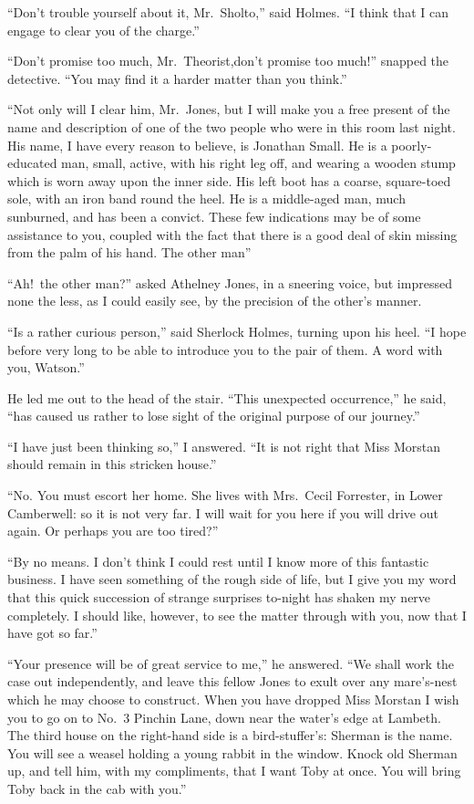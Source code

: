 \documentclass[12pt,english,oneside]{book}
\begin{document}
{}``Don't trouble yourself about it, Mr.\ Sholto,'' said Holmes.
{}``I think that I can engage to clear you of the charge.''

{}``Don't promise too much, Mr.\ Theorist,\mdsh{---}don't promise
too much!'' snapped the detective. {}``You may find it a harder
matter than you think.''

{}``Not only will I clear him, Mr.\ Jones, but I will make you a
free present of the name and description of one of the two people
who were in this room last night. His name, I have every reason to
believe, is Jonathan Small. He is a poorly-educated man, small, active,
with his right leg off, and wearing a wooden stump which is worn away
upon the inner side. His left boot has a coarse, square-toed sole,
with an iron band round the heel. He is a middle-aged man, much sunburned,
and has been a convict. These few indications may be of some assistance
to you, coupled with the fact that there is a good deal of skin missing
from the palm of his hand. The other man\mdsh{---}''

{}``Ah!\ the other man\mdsh{---}?'' asked Athelney Jones, in a
sneering voice, but impressed none the less, as I could easily see,
by the precision of the other's manner.

{}``Is a rather curious person,'' said Sherlock Holmes, turning
upon his heel. {}``I hope before very long to be able to introduce
you to the pair of them.\mdsh{---} A word with you, Watson.''

He led me out to the head of the stair. {}``This unexpected occurrence,''
he said, {}``has caused us rather to lose sight of the original purpose
of our journey.''

{}``I have just been thinking so,'' I answered. {}``It is not right
that Miss Morstan should remain in this stricken house.''

{}``No. You must escort her home. She lives with Mrs.\ Cecil Forrester,
in Lower Camberwell: so it is not very far. I will wait for you here
if you will drive out again. Or perhaps you are too tired?''

{}``By no means. I don't think I could rest until I know more of
this fantastic business. I have seen something of the rough side of
life, but I give you my word that this quick succession of strange
surprises to-night has shaken my nerve completely. I should like,
however, to see the matter through with you, now that I have got so
far.''

{}``Your presence will be of great service to me,'' he answered.
{}``We shall work the case out independently, and leave this fellow
Jones to exult over any mare's-nest which he may choose to construct.
When you have dropped Miss Morstan I wish you to go on to No.\ 3
Pinchin Lane, down near the water's edge at Lambeth. The third house
on the right-hand side is a bird-stuffer's: Sherman is the name. You
will see a weasel holding a young rabbit in the window. Knock old
Sherman up, and tell him, with my compliments, that I want Toby at
once. You will bring Toby back in the cab with you.''
\end{document}
